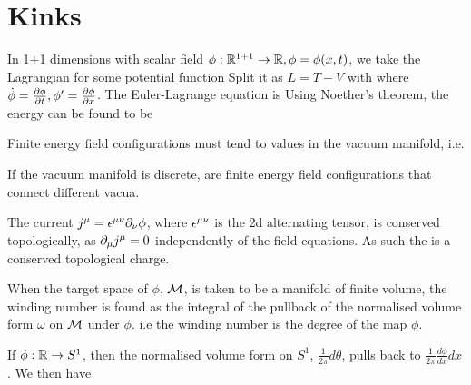 \documentclass{article}
\begin{document}
\section{Kinks}

In 1+1 dimensions with scalar field $\phi:\mbb{R}^{1+1} \to \mbb{R}, \phi=\phi(x,t)$, we take the Lagrangian 
for some potential function Split it as $L=T-V$ with 
where $\dot{\phi} = \pd[\phi]{t}, \phi^\prime = \pd[\phi]{x}$. The Euler-Lagrange equation is 
Using Noether's theorem, the energy can be found to be 

\begin{prop}
Finite energy field configurations must tend to values in the vacuum manifold, i.e. 
\end{prop}

\begin{definition}[Kinks]
If the vacuum manifold is discrete,  are finite energy field configurations that connect different vacua. 
\end{definition}

\begin{definition}
The current $j^\mu = \eps^{\mu\nu}\del_\nu \phi$, where $\eps^{\mu\nu}$ is the 2d alternating tensor, is conserved topologically, as $\del_\mu j^\mu = 0$ independently of the field equations. As such the 
is a conserved topological charge.
\end{definition}

\begin{prop}
When the target space of $\phi$, $\mc{M}$, is taken to be a manifold of finite volume, the winding number is found as the integral of the pullback of the normalised volume form $\omega$ on $\mc{M}$ under $\phi$. i.e the winding number is the degree of the map $\phi$. 
\end{prop}

\begin{example}
If $\phi:\mbb{R} \to S^1$, then the normalised volume form on $S^1$, $\frac{1}{2\pi}d\theta$, pulls back to $\frac{1}{2\pi}\frac{d\phi}{dx}dx$. We then have 
\end{example}
\end{document}
